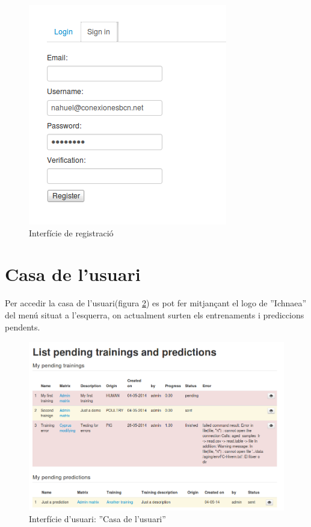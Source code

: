 \begin{figure}[h!]
  \centering
  \includegraphics[scale=0.4]{img/userguide/signup.png}
  \caption{Interfície de registració}
  \label{fig:signup}
\end{figure}


\section{Casa de l'usuari}
\label{sec:home}
Per accedir la casa de l'usuari(figura \ref{fig:dashboard}) es pot fer mitjançant el logo de ''Ichnaea'' del menú situat a l'esquerra, on actualment surten els entrenaments i prediccions pendents.\\

\begin{figure}[h!]
  \centering
  \includegraphics[scale=0.4]{img/userguide/dashboard.png}
  \caption{Interfície d'usuari: ''Casa de l'usuari''}
  \label{fig:dashboard}
\end{figure}

